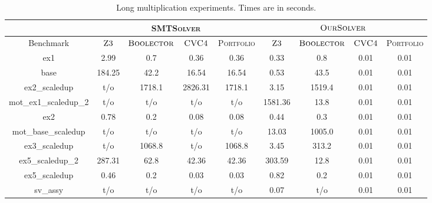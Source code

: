 \begin{table}[t]
\centering
\caption{Long multiplication experiments. Times are in seconds.}
\label{my-label}
\begin{tabular}{|c|c|c|c|c|c|c|c|c|}
\hline
                      & \multicolumn{4}{c|}{\textsc{SMTSolver}}                    & \multicolumn{4}{c|}{$\textsc{OurSolver}$}                              \\ \hline
Benchmark             & $\textsc{Z3}$ & $\textsc{Boolector}$ & $\textsc{CVC4}$ & \textsc{Portfolio} & $\textsc{Z3}$ & $\textsc{Boolector}$ & $\textsc{CVC4}$ & \textsc{Portfolio} \\ \hline
ex1                   & 2.99      & 0.7          & 0.36       & 0.36                 & 0.33      & 0.8          & 0.01       & 0.01                 \\ \hline
base                  & 184.25    & 42.2         & 16.54      & 16.54                & 0.53      & 43.5         & 0.01       & 0.01                 \\ \hline
ex2\_scaledup         & t/o       & 1718.1       & 2826.31    & 1718.1               & 3.15      & 1519.4       & 0.01       & 0.01                 \\ \hline
mot\_ex1\_scaledup\_2 & t/o       & t/o          & t/o        & t/o                  & 1581.36   & 13.8         & 0.01       & 0.01                 \\ \hline
ex2                   & 0.78      & 0.2          & 0.08       & 0.08                 & 0.44      & 0.3          & 0.01       & 0.01                 \\ \hline
mot\_base\_scaledup   & t/o       & t/o          & t/o        & t/o                  & 13.03     & 1005.0       & 0.01       & 0.01                 \\ \hline
ex3\_scaledup         & t/o       & 1068.8       & t/o        & 1068.8               & 3.45      & 313.2        & 0.01       & 0.01                 \\ \hline
ex5\_scaledup\_2      & 287.31    & 62.8         & 42.36      & 42.36                & 303.59    & 12.8         & 0.01       & 0.01                 \\ \hline
ex5\_scaledup         & 0.46      & 0.2          & 0.03       & 0.03                 & 0.82      & 0.2          & 0.01       & 0.01                 \\ \hline
sv\_assy              & t/o       & t/o          & t/o        & t/o                  & 0.07      & t/o          & 0.01       & 0.01                 \\ \hline

\end{tabular}
\end{table}
